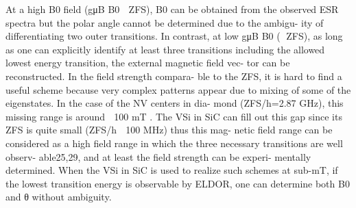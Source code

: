 \begin{figure}[h]
    \begin{center}
    \end{center}
    \caption{}\label{fig:resonant_crossing_V2}
\end{figure}
\begin{group}
    \color{gray}
At a high B0 field (gμB B0  ZFS),
B0 can be obtained from the observed ESR spectra but
the polar angle cannot be determined due to the ambigu-
ity of differentiating two outer transitions. In contrast,
at low gμB B0 ( ZFS), as long as one can explicitly
identify at least three transitions including the allowed
lowest energy transition, the external magnetic field vec-
tor can be reconstructed. In the field strength compara-
ble to the ZFS, it is hard to find a useful scheme because
very complex patterns appear due to mixing of some of
the eigenstates. In the case of the NV centers in dia-
mond (ZFS/h=2.87 GHz), this missing range is around
∼ 100 mT . The VSi in SiC can fill out this gap since its
ZFS is quite small (ZFS/h ∼ 100 MHz) thus this mag-
netic field range can be considered as a high field range
in which the three necessary transitions are well observ-
able25,29, and at least the field strength can be experi-
mentally determined. When the VSi in SiC is used to
realize such schemes at sub-mT, if the lowest transition
energy is observable by ELDOR, one can determine both
B0 and θ without ambiguity. 
\end{group}


